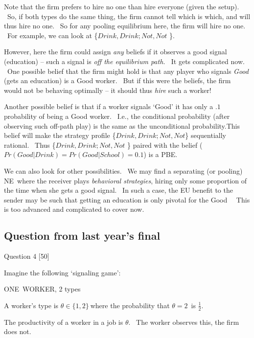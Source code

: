\documentclass{article}
\begin{document}
Note that the firm prefers to hire no one than hire everyone (given the
setup). \ So, if both types do the same thing, the firm cannot tell which is
which, and will thus hire no one. \ So for any pooling equilibrium here, the
firm will hire no one. \ For example, we can look at \{$Drink,Drink;Not,Not$%
\}.

\bigskip

However, here the firm could assign \textit{any} beliefs if it observes a
good signal (education) -- such a signal is \textit{off the equilibrium
path. \ }It gets complicated now. \ One possible belief that the firm might
hold is that any player who signals \textit{Good} (gets an education) is a
Good worker. \ But if this were the beliefs, the firm would not be behaving
optimally -- it should thus \textit{hire} such a worker!

\bigskip

Another possible belief is that if a worker signals `Good' it has only a $.1$
probability of being a Good worker. \ I.e., the conditional probability
(after observing such off-path play) is the same as the unconditional
probability.This belief will make the strategy profile \{$%
Drink,Drink;Not,Not $\} sequentially rational. \ Thus \{$Drink,Drink;Not,Not$%
\} paired with the belief ($Pr(Good|Drink)=Pr(Good|School)=0.1$) is a PBE.

\bigskip

We can also look for other possibilities. \ We may find a separating (or
pooling) NE\ where the receiver plays \textit{behavioral strategies}, hiring
only some proportion of the time when she gets a good signal. \ In such a
case, the EU benefit to the sender may be such that getting an education is
only pivotal for the Good \ \ This is too advanced and complicated to cover
now.

\bigskip

\bigskip

\subsection{Question from last year's final}

{\Large Question 4 [50]}

Imagine the following `signaling game':

ONE\ WORKER, 2 types

A worker's type is $\theta \in \{1,2\}\ $where the probability that $\theta
=2$\ is $\frac{1}{2}$. \

The productivity of a worker in a job is $\theta $. \ The worker observes
this, the firm does not.
\end{document}
